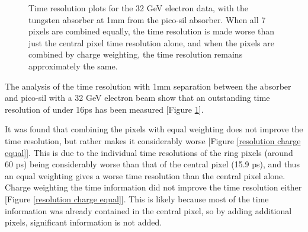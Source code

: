\documentclass[twocolumn,aps,prd,reprint]{revtex4-1}
\begin{document}
\begin{figure}[!htbp]
\hspace{3mm}
\hspace{3mm}
\caption{Time resolution plots for the 32 GeV electron data, with the tungsten absorber at 1mm from the pico-sil absorber. When all 7 pixels are combined equally, the time resolution is made worse than just the central pixel time resolution alone, and when the pixels are combined by charge weighting, the time resolution remains approximately the same.}
\label{pixel TOF 1mm}
\end{figure}

The analysis of the time resolution with 1mm separation between the absorber and pico-sil with a 32 GeV electron beam show that an outstanding time resolution of under 16ps has been measured [Figure \ref{pixel TOF 1mm}].

It was found that combining the pixels with equal weighting does not improve the time resolution, but rather makes it considerably worse [Figure \ref{resolution charge equal}]. This is due to the individual time resolutions of the ring pixels (around 60 ps) being considerably worse than that of the central pixel (15.9 ps), and thus an equal weighting gives a worse time resolution than the central pixel alone. Charge weighting the time information did not improve the time resolution either [Figure \ref{resolution charge equal}]. This is likely because most of the time information was already contained in the central pixel, so by adding additional pixels, significant information is not added.
\end{document}
